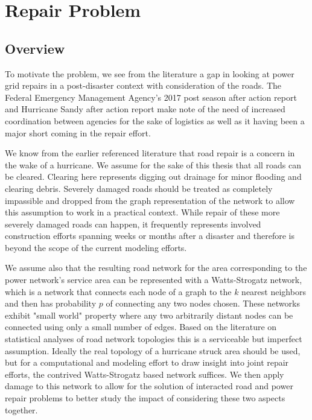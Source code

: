 \documentclass{article}
\begin{document}
	
	\section{Repair Problem}
	
	\subsection{Overview}
	To motivate the problem, we see from the literature a gap in looking at power grid repairs in a post-disaster context with consideration of the roads. The Federal Emergency Management Agency's 2017 post season after action report\cite{FEMA2017AAR}  and Hurricane Sandy after action report \cite{FEMASandyAAR} make note of the need of increased coordination between agencies for the sake of logistics as well as it having been a major short coming in the repair effort.
	
	We know from the earlier referenced literature that road repair is a concern in the wake of a hurricane. We assume for the sake of this thesis that all roads can be cleared. Clearing here represents digging out drainage for minor flooding and clearing debris. Severely damaged roads should be treated as completely impassible and dropped from the graph representation of the network to allow this assumption to work in a practical context. While repair of these more severely damaged roads can happen, it frequently represents involved construction efforts spanning weeks or months after a disaster and therefore is beyond the scope of the current modeling efforts.
	
	We assume also that the resulting road network for the area corresponding to the power network's service area can be represented with a Watts-Strogatz network, which is a network that connects each node of a graph to the $k$ nearest neighbors and then has probability $p$ of connecting any two nodes chosen. These networks exhibit "small world" property where any two arbitrarily distant nodes can be connected using only a small number of edges. Based on the literature on statistical analyses of road network topologies \cite{LammerEA2006} \cite{ChanEA2011} this is a serviceable but imperfect assumption. Ideally the real topology of a hurricane struck area should be used, but for a computational and modeling effort to draw insight into joint repair efforts, the contrived Watts-Strogatz based network suffices. We then apply damage to this network to allow for the solution of interacted road and power repair problems to better study the impact of considering these two aspects together.
		
\end{document}
